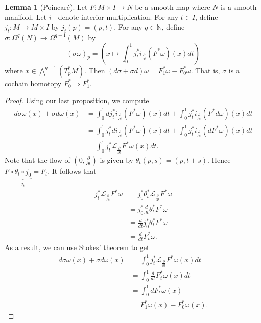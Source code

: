 \documentclass[10pt,letterpaper,cm]{nupset}
\theoremstyle{definition}
\theoremstyle{theorem}
\newtheorem{lemma}[definition]{Lemma}
\theoremstyle{remark}
\newcommand{\N}{\mathbb N}
\newcommand{\1}{\mathbb{1}}
\newcommand{\0}{\vec 0}
\begin{document}
\begin{lemma}[Poincar\'e]
 Let $F: M \times I \to N$ be a smooth map where $N$ is a smooth manifold. Let $i_{{-}}$ denote interior multiplication. 
 For any $t\in I$, define $j_t: M \to M\times I$ by $j_t(p) = (p,t)$.
 For any $q\in \N$, define $\sigma  : \Omega^q(N) \to \Omega^{q-1}(M)$ by $$(\sigma{\omega})_p = (x \mapsto \int_0^1 j_t^{\ast}i_{\frac{\partial}{\partial{t}}}(F^{\ast}{\omega})(x) dt)$$ where $x\in \bigwedge^{q-1}(T_p^{\ast}{M})$. Then $(d\sigma + \sigma d)\omega = F_1^{\ast} \omega - F_0^{\ast}\omega$. That is, $\sigma$ is a cochain homotopy $F^{\ast}_0 \Rightarrow F^{\ast}_1$.
\end{lemma}
\begin{proof}
Using our last proposition, we compute
\begin{align*}
d\sigma \omega(x) + \sigma d \omega(x) & =  \int_0^1 dj_t^{\ast}i_{\frac{\partial}{\partial{t}}}(F^{\ast}{\omega})(x) dt + \int_0^1j_t^{\ast} i_{\frac{\partial}{\partial{t}}}(F^{\ast}{d\omega})(x) dt
\\ & =   \int_0^1 j_t^{\ast}di_{\frac{\partial}{\partial{t}}}(F^{\ast}{\omega})(x) dt + \int_0^1 j_t^{\ast}i_{\frac{\partial}{\partial{t}}}(dF^{\ast}{\omega})(x) dt
\\ & = \int_0^1 j_t^{\ast}\mathcal{L}_{\frac{\partial}{\partial{t}}}{F^{\ast}{\omega}}(x)dt
 . \end{align*} Note that the flow of $(0, \frac{\partial}{\partial{t}})$ is given by $\theta_t(p,s) = (p, t+s)$. Hence $F \circ \underbrace{\theta_t \circ j_0}_{j_t} = F_t$. It follows that
\begin{align*}
j_t^{\ast}\mathcal{L}_{\frac{\partial}{\partial{t}}}{F^{\ast}{\omega}}
& = j_0^{\ast} \theta_t^{\ast}\mathcal{L}_{\frac{\partial}{\partial{t}}}{F^{\ast}{\omega}}
\\ & =  j_0^{\ast}\frac{d}{dt}\theta_t^{\ast}F^{\ast}\omega
\\ & = \frac{d}{dt}j_0^{\ast}\theta_t^{\ast}F^{\ast}\omega
\\ & = \frac{d}{dt}F_t^{\ast}{\omega}
. \end{align*}
 As a result, we can use Stokes' theorem to get
  \begin{align*}
d\sigma \omega(x) + \sigma d \omega(x) & =  \int_0^1 j_t^{\ast}\mathcal{L}_{\frac{\partial}{\partial{t}}}{F^{\ast}{\omega}}(x)dt
\\ & = \int_0^1 \frac{d}{dt}F_t^{\ast}{\omega}(x)dt
\\ & = \int_0^1 dF_t^{\ast}{\omega}(x)
\\ & = F^{\ast}_1{\omega}(x) - F^{\ast}_0{\omega}(x)
 . \end{align*}
\end{proof}
\end{document}
